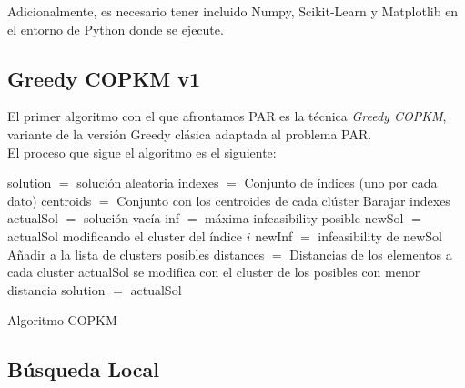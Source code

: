 \vspace{\baselineskip}

Adicionalmente, es necesario tener incluido Numpy, Scikit-Learn y Matplotlib en el entorno de Python donde se ejecute.

\newpage


\subsection{Greedy COPKM v1}
El primer algoritmo con el que afrontamos PAR es la técnica \textit{Greedy COPKM}, variante de la versión Greedy clásica adaptada al problema PAR. \\

El proceso que sigue el algoritmo es el siguiente: \\

\begin{algorithm}[H]
    \SetAlgoLined
        solution $=$ solución aleatoria \;
        indexes $=$ Conjunto de índices (uno por cada dato) \;
        centroids $=$ Conjunto con los centroides de cada clúster \;
        Barajar indexes \;
         {
            actualSol $=$ solución vacía \;
             {
                inf $=$ máxima infeasibility posible \;
                 {
                    newSol $=$ actualSol modificando el cluster del índice $i$ \;
                    newInf $=$ infeasibility de newSol \;
                     {
                        Añadir a la lista de clusters posibles \;
                    }
                }
                distances $=$ Distancias de los elementos a cada cluster \;
                actualSol se modifica con el cluster de los posibles con menor distancia \; 
            }
            solution $=$ actualSol \;
        }
    \caption{Algoritmo COPKM}
\end{algorithm}


\newpage

\subsection{Búsqueda Local}

